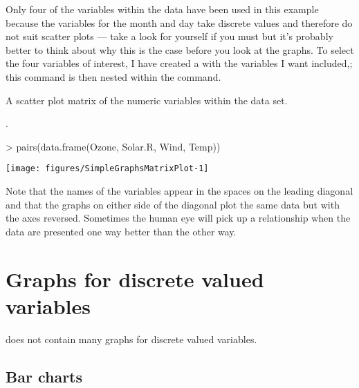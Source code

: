 Only four of the variables within the  data have been used in this example because the variables for the month and day take discrete values and therefore do not suit scatter plots --- take a look for yourself if you must but it's probably better to think about why this is the case before you look at the graphs. To select the four variables of interest, I have created a  with the variables I want included,; this  command is then nested within the  command. 
\begin{exhibit} 
\begin{center} 
\caption{A scatter plot matrix of the numeric variables within the  data set.} 
\label{AirQualityScatterPlotMatrix}. 
\begin{Schunk}
\begin{Sinput}
> pairs(data.frame(Ozone, Solar.R, Wind, Temp)) 
\end{Sinput}

\texttt{[image: figures/SimpleGraphsMatrixPlot-1]} \end{Schunk}
\end{center} 
\end{exhibit} 
 
Note that the names of the variables appear in the spaces on the leading diagonal and that the graphs on either side of the diagonal plot the same data but with the axes reversed. Sometimes the human eye will pick up a relationship when the data are presented one way better than the other way. 
 
\section{Graphs for discrete valued variables} 
 
\R{} does not contain many graphs for discrete valued variables. 
 
\subsection{Bar charts} 
\label{BarCharts} 
 
